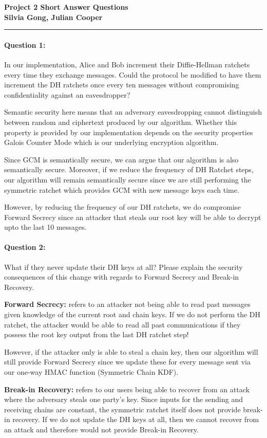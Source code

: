 \documentclass[12pt,letterpaper,twoside]{article}
\begin{document}
{\centering \textbf{Project 2 Short Answer Questions\\ Silvia Gong, Julian Cooper\\}}
\vspace*{-8pt}\noindent\rule{\linewidth}{1pt}

\paragraph{Question 1: } In our implementation, Alice and Bob increment their
Diffie-Hellman ratchets every time they exchange messages. Could the protocol
be modified to have them increment the DH ratchets once every ten messages 
without compromising confidentiality against an eavesdropper?

{\color{purple} Semantic security here means that an adversary eavesdropping
cannot distinguish between random and ciphertext produced by our algorithm. 
Whether this property is provided by our implementation depends on the security 
properties Galois Counter Mode which is our underlying encryption algorithm.

Since GCM is semantically secure, we can argue that our algorithm is also 
semantically secure. Moreover, if we reduce the frequency of DH Ratchet steps,
our algorithm will remain semantically secure since we are still performing the
symmetric ratchet which provides GCM with new message keys each time.

However, by reducing the frequency of our DH ratchets, we do compromise Forward
Secrecy since an attacker that steals our root key will be able to decrypt upto
the last 10 messages. }


\paragraph{Question 2: } What if they never update their DH keys at all?
Please explain the security consequences of this change with regards to
Forward Secrecy and Break-in Recovery.

{\color{purple} 
\textbf{Forward Secrecy: } refers to an attacker not being 
able to read past messages given knowledge of the current root and chain keys. 
If we do not perform the DH ratchet, the attacker would be able to read all 
past communications if they possess the root key output from the last DH 
ratchet step!

However, if the attacker only is able to steal a chain key, then our algorithm 
will still provide Forward Secrecy since we update these for every message sent 
via our one-way HMAC function (Symmetric Chain KDF).

\textbf{Break-in Recovery: } refers to our users being able to recover from 
an attack where the adversary steals one party's key. Since inputs for the 
sending and receiving chains are constant, the symmetric ratchet itself does 
not provide break-in recovery. If we do not update the DH keys at all, then 
we cannot recover from an attack and therefore would not provide Break-in 
Recovery. }
\end{document}
